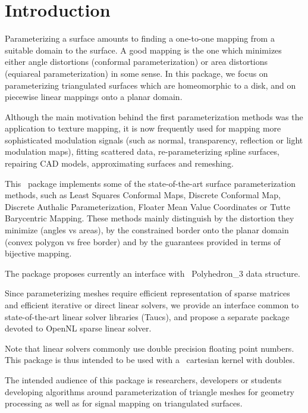 \section{Introduction}

Parameterizing a surface amounts to finding a one-to-one mapping from
a suitable domain to the surface. A good mapping is the one which
minimizes either angle distortions (conformal parameterization) or
area distortions (equiareal parameterization) in some sense.  In this
package, we focus on parameterizing triangulated surfaces which are
homeomorphic to a disk, and on piecewise linear mappings onto a planar
domain.

Although the main motivation behind the first parameterization methods
was the application to texture mapping, it is now frequently used for
mapping more sophisticated modulation signals (such as normal,
transparency, reflection or light modulation maps), fitting scattered
data, re-parameterizing spline surfaces, repairing CAD models,
approximating surfaces and remeshing.

This \cgal\ package implements some of the state-of-the-art
surface parameterization methods, such as Least Squares Conformal Maps,
Discrete Conformal Map, Discrete Authalic
Parameterization, Floater Mean Value Coordinates or Tutte Barycentric
Mapping. These methods mainly distinguish by the distortion they
minimize (angles vs areas), by the constrained border onto the
planar domain (convex polygon vs free border) and by the guarantees
provided in terms of bijective mapping.

The package proposes currently an interface with \cgal\ Polyhedron_3
data structure.

Since parameterizing meshes require efficient representation of sparse
matrices and efficient iterative or direct linear solvers, we provide
an interface common to state-of-the-art linear solver libraries ({\sc Taucs}),
and propose a separate package devoted to OpenNL sparse
linear solver.

Note that linear solvers commonly use double precision floating point
numbers. This package is thus intended to be used with a \cgal\
cartesian kernel with doubles.

The intended audience of this package is researchers, developers or
students developing algorithms around parameterization of triangle
meshes for geometry processing as well as for signal mapping on
triangulated surfaces.

